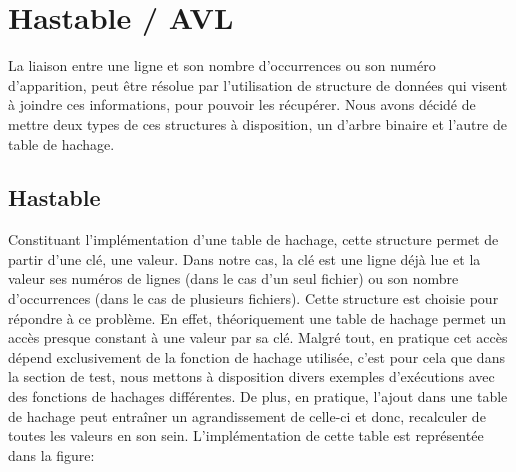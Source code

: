 \documentclass[12pt]{article}
\begin{document}
    \section{Hastable / AVL}

    La liaison entre une ligne et son nombre d'occurrences ou son numéro 
    d'apparition, peut être résolue par l'utilisation de structure de données qui 
    visent à joindre ces informations, pour pouvoir les récupérer. Nous avons 
    décidé de mettre deux types de ces structures à disposition, un d'arbre 
    binaire et l'autre de table de hachage. 

    \subsection{Hastable}

    Constituant l'implémentation d'une table de hachage, cette structure permet 
    de partir d'une clé, une valeur. Dans notre cas, la clé est une ligne déjà lue et 
    la valeur ses numéros de lignes (dans le cas d'un seul fichier) ou son 
    nombre d'occurrences (dans le cas de plusieurs fichiers). Cette structure 
    est choisie pour répondre à ce problème. En effet, théoriquement une 
    table de hachage permet un accès presque constant à une valeur par sa clé. 
    Malgré tout, en pratique cet accès dépend exclusivement de la fonction 
    de hachage utilisée, c'est pour cela que dans la section de test, nous 
    mettons à disposition divers exemples d'exécutions avec des fonctions de 
    hachages différentes. De plus, en pratique, l'ajout dans une table de 
    hachage peut entraîner un agrandissement de celle-ci et donc, recalculer de 
    toutes les valeurs en son sein. L'implémentation de cette table est 
    représentée dans la figure\@: 
    
\end{document}
